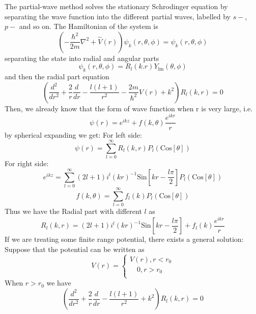 The partial-wave method solves the stationary Schrodinger equation by separating the wave function into the different partial waves, labelled by $s-$, $p-$ and so on. The Hamiltonian of the system is
\begin{equation}
\left(-\frac{\hbar ^2}{2m}\nabla ^2+\hat{V}(r)\right)\psi _k(r,\theta ,\phi )=\psi _k(r,\theta ,\phi )
\end{equation}
separating the state into radial and angular parts
\begin{equation}
\psi _k(r,\theta ,\phi )=R_l(k.r)Y_{\text{lm}}(\theta,\phi)
\end{equation}
and then the radial part equation
\begin{equation}
\left(\frac{d^2}{dr^2}+\frac{2}{r}\frac{d}{dr}-\frac{l(l+1)}{r^2}-\frac{2m}{\hbar ^2}V(r)+k^2\right)R_l(k,r)=0
\end{equation}
Then, we already know that the form of wave function when r is very large, i.e.
\begin{equation}
\psi (r)=e^{i k z}+f(k,\theta )\frac{e^{i k r}}{r}
\end{equation}
by spherical expanding we get:
For left side:
\begin{equation}
\psi (r)=\sum _{l =0}^{\infty } R_l(k,r)P_l(\text{Cos}[\theta ])
\end{equation}
For right side:
\begin{equation}
e^{i k z}=\sum _{l=0}^{\infty}(2l+1)i^l(kr)^{-1}\text{Sin}\left[k r-\frac{l \pi }{2}\right]P_l(\text{Cos}[\theta])
\end{equation}
\begin{equation}
f(k,\theta )=\sum _{l =0}^{\infty } f_l(k)P_l(\text{Cos}[\theta ])
\end{equation}
Thus we have the Radial part with different $l$ as
\begin{equation}
R_l(k,r)=(2l+1)i^l(k r)^{-1}\text{Sin}\left[k r-\frac{l \pi }{2}\right]+f_l(k)\frac{e^{i k r}}{r}
\end{equation}
If we are treating some finite range potential, there exists a general solution:
Suppose that the potential can be written as
\begin{equation}
V(r)=\left\{
\begin{array}{c}
 V(r), r<r_0 \\
 \quad 0, r>r_0 \\
\end{array}
\right.
\end{equation}
When $r>r_0$ we have
\begin{equation}
\left(\frac{d^2}{dr^2}+\frac{2}{r}\frac{d}{dr}-\frac{l(l+1)}{r^2}+k^2\right)R_l(k,r)=0
\end{equation}
